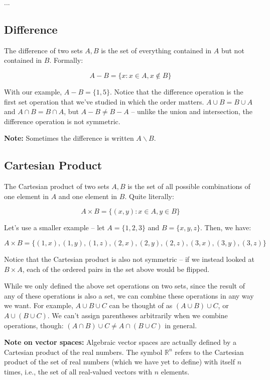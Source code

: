 \documentclass{article}
\begin{document}
...

\subsection*{Difference}
The difference of two sets $A, B$ is the set of everything contained in $A$ but not contained in $B$. Formally:

\[
\boxed{A - B = \{x : x \in A, x \not \in B \}}
\]

With our example, $A - B = \{1, 5\}$. Notice that the difference operation is the first set operation that we’ve studied in which the order matters. $A \cup B = B \cup A$ and $A \cap B = B \cap A$, but $A - B \neq B - A$ – unlike the union and intersection, the difference operation is not symmetric.

\textbf{Note:} Sometimes the difference is written $A \backslash B$.

\subsection*{Cartesian Product}
The Cartesian product of two sets $A, B$ is the set of all possible combinations of one element in $A$ and one element in $B$. Quite literally:

\[
\boxed{A \times B = \{(x, y) : x \in A, y \in B \}}
\]

Let’s use a smaller example – let $A = \{1, 2, 3\}$ and $B = \{x, y, z\}$. Then, we have:

\[
A \times B = \{(1, x), (1, y), (1, z), (2, x), (2, y), (2, z), (3, x), (3, y), (3, z) \}
\]

Notice that the Cartesian product is also not symmetric – if we instead looked at $B \times A$, each of the ordered pairs in the set above would be flipped.

While we only defined the above set operations on two sets, since the result of any of these operations is also a set, we can combine these operations in any way we want. For example, $A \cup B \cup C$ can be thought of as $(A \cup B) \cup C$, or $A \cup (B \cup C)$. We can’t assign parentheses arbitrarily when we combine operations, though: $(A \cap B) \cup C \neq A \cap (B \cup C)$ in general.

\textbf{Note on vector spaces:} Algebraic vector spaces are actually defined by a Cartesian product of the real numbers. The symbol $\mathbb{R}^n$ refers to the Cartesian product of the set of real numbers (which we have yet to define) with itself $n$ times, i.e., the set of all real-valued vectors with $n$ elements.
\end{document}
